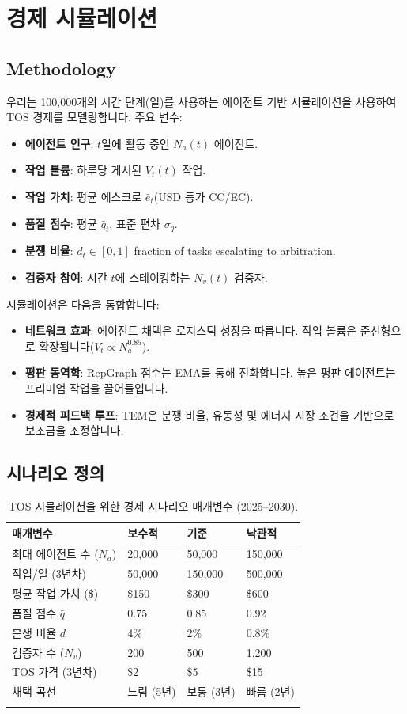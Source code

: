 \documentclass[11pt]{article}
\begin{document}
\section{경제 시뮬레이션}
\label{sec:econ-sim}

\subsection{Methodology}
우리는 100,000개의 시간 단계(일)를 사용하는 에이전트 기반 시뮬레이션을 사용하여 TOS 경제를 모델링합니다. 주요 변수:
\begin{itemize}[noitemsep]
  \item \textbf{에이전트 인구}: $t$일에 활동 중인 $N_a(t)$ 에이전트.
  \item \textbf{작업 볼륨}: 하루당 게시된 $V_t(t)$ 작업.
  \item \textbf{작업 가치}: 평균 에스크로 $\bar{e}_t$(USD 등가 CC/EC).
  \item \textbf{품질 점수}: 평균 $\bar{q}_t$, 표준 편차 $\sigma_q$.
  \item \textbf{분쟁 비율}: $d_t \in [0,1]$ fraction of tasks escalating to arbitration.
  \item \textbf{검증자 참여}: 시간 $t$에 스테이킹하는 $N_v(t)$ 검증자.
\end{itemize}
시뮬레이션은 다음을 통합합니다:
\begin{itemize}[noitemsep]
  \item \textbf{네트워크 효과}: 에이전트 채택은 로지스틱 성장을 따릅니다. 작업 볼륨은 준선형으로 확장됩니다($V_t \propto N_a^{0.85}$).
  \item \textbf{평판 동역학}: RepGraph 점수는 EMA를 통해 진화합니다. 높은 평판 에이전트는 프리미엄 작업을 끌어들입니다.
  \item \textbf{경제적 피드백 루프}: TEM은 분쟁 비율, 유동성 및 에너지 시장 조건을 기반으로 보조금을 조정합니다.
\end{itemize}

\subsection{시나리오 정의}
\begin{longtable}{@{}p{}p{}p{}p{}@{}}
\toprule
\textbf{매개변수} & \textbf{보수적} & \textbf{기준} & \textbf{낙관적} \\\midrule
최대 에이전트 수 ($N_a$) & 20,000 & 50,000 & 150,000 \\
작업/일 (3년차) & 50,000 & 150,000 & 500,000 \\
평균 작업 가치 (\$) & \$150 & \$300 & \$600 \\
품질 점수 $\bar{q}$ & 0.75 & 0.85 & 0.92 \\
분쟁 비율 $d$ & 4\% & 2\% & 0.8\% \\
검증자 수 ($N_v$) & 200 & 500 & 1,200 \\
TOS 가격 (3년차) & \$2 & \$5 & \$15 \\
채택 곡선 & 느림 (5년) & 보통 (3년) & 빠름 (2년) \\\bottomrule
\caption{TOS 시뮬레이션을 위한 경제 시나리오 매개변수 (2025--2030).}
\label{tab:econ-scenarios}
\end{longtable}
\end{document}
